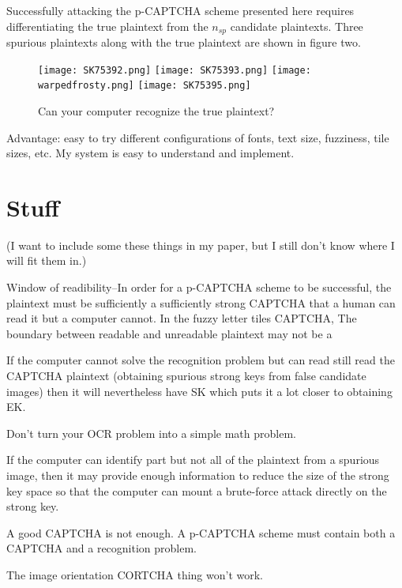 \documentclass[12pt]{article}
\begin{document}
	Successfully attacking the p-CAPTCHA scheme presented here requires differentiating the true plaintext from the $n_{sp}$ candidate plaintexts. Three spurious plaintexts along with the true plaintext are shown in figure two.

\begin{figure}
	\texttt{[image: SK75392.png]}
	\texttt{[image: SK75393.png]}
	\texttt{[image: warpedfrosty.png]}
	\texttt{[image: SK75395.png]}
	\caption{Can your computer recognize the true plaintext?}
\label{warpedSK}
\end{figure}





Advantage: easy to try different configurations of fonts, text size, fuzziness, tile sizes, etc.
My system is easy to understand and implement.

\section*{Stuff}
(I want to include some these things in my paper, but I still don't know where I will fit them in.)

Window of readibility--In order for a p-CAPTCHA scheme to be successful, the plaintext must be sufficiently a sufficiently strong CAPTCHA that a human can read it but a computer cannot. In the fuzzy letter tiles CAPTCHA,  The boundary between readable and unreadable plaintext may not be a 

If the computer cannot solve the recognition problem but can read still read the CAPTCHA plaintext (obtaining spurious strong keys from false candidate images) then it will nevertheless have SK which puts it a lot closer to obtaining EK.

Don't turn your OCR problem into a simple math problem.

If the computer can identify part but not all of the plaintext from a spurious image, then it may provide enough information to reduce the size of the strong key space so that the computer can mount a brute-force attack directly on the strong key. 

A good CAPTCHA is not enough. A p-CAPTCHA scheme must contain both a CAPTCHA and a recognition problem.

The image orientation CORTCHA thing won't work.
\end{document}
